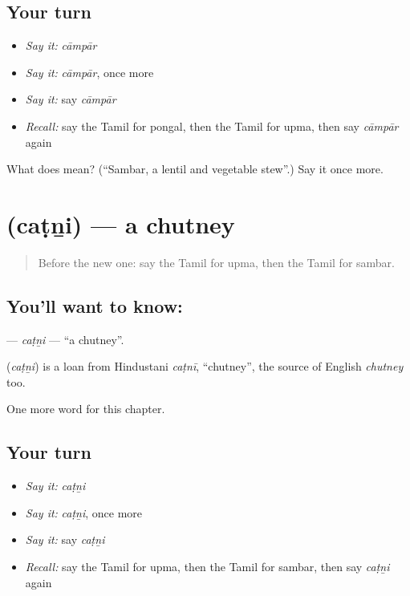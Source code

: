 \subsection*{Your turn}
\begin{itemize}
\raggedright
  \item \emph{Say it:} \emph{cāmpār}
  \item \emph{Say it:} \emph{cāmpār}, once more
  \item \emph{Say it:} say \emph{cāmpār}
  \item \emph{Recall:} say the Tamil for pongal, then the Tamil for upma, then say \emph{cāmpār} again
\end{itemize}

\begin{tcolorbox}[breakable,colback=teal!4,colframe=teal!35!black,title={Before you move on}]
What does  mean? (\textquotedblleft{}Sambar, a lentil and vegetable stew\textquotedblright{}.) Say it once more.
\end{tcolorbox}
\section[\texorpdfstring{\ta{சட்னி} (caṭṉi)}{சட்னி (caṭṉi)}]{ (caṭṉi) — a chutney}

\label{lesson:TA-C183-catni}



\begin{quote}
Before the new one: say the Tamil for upma, then the Tamil for sambar.
\end{quote}

\subsection*{You'll want to know: }
\textbf{} — \emph{caṭṉi} — \textquotedblleft{}a chutney\textquotedblright{}.

\begin{cousinweb}
\textbf{} (\emph{caṭṉi}) is a loan from Hindustani \emph{caṭnī}, \textquotedblleft{}chutney\textquotedblright{}, the source of English \emph{chutney} too.
\end{cousinweb}

\begin{grammarlens}[title={What you've built}]
One more word for this chapter.
\end{grammarlens}

\subsection*{Your turn}
\begin{itemize}
\raggedright
  \item \emph{Say it:} \emph{caṭṉi}
  \item \emph{Say it:} \emph{caṭṉi}, once more
  \item \emph{Say it:} say \emph{caṭṉi}
  \item \emph{Recall:} say the Tamil for upma, then the Tamil for sambar, then say \emph{caṭṉi} again
\end{itemize}


